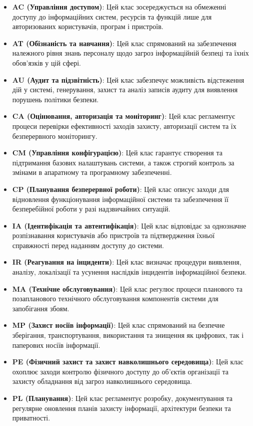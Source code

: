 \documentclass{article}
\begin{document}
\begin{itemize}
    \item \textbf{AC (Управління доступом)}: Цей клас зосереджується на обмеженні доступу до інформаційних систем, ресурсів та функцій лише для авторизованих користувачів, програм і пристроїв.
    \item \textbf{AT (Обізнаність та навчання)}: Цей клас спрямований на забезпечення належного рівня знань персоналу щодо загроз інформаційній безпеці та їхніх обов'язків у цій сфері.
    \item \textbf{AU (Аудит та підзвітність)}: Цей клас забезпечує можливість відстеження дій у системі, генерування, захист та аналіз записів аудиту для виявлення порушень політики безпеки.
    \item \textbf{CA (Оцінювання, авторизація та моніторинг)}: Цей клас регламентує процеси перевірки ефективності заходів захисту, авторизації систем та їх безперервного моніторингу.
    \item \textbf{CM (Управління конфігурацією)}: Цей клас гарантує створення та підтримання базових налаштувань системи, а також строгий контроль за змінами в апаратному та програмному забезпеченні.
    \item \textbf{CP (Планування безперервної роботи)}: Цей клас описує заходи для відновлення функціонування інформаційної системи та забезпечення її безперебійної роботи у разі надзвичайних ситуацій.
    \item \textbf{IA (Ідентифікація та автентифікація)}: Цей клас відповідає за однозначне розпізнавання користувачів або пристроїв та підтвердження їхньої справжності перед наданням доступу до системи.
    \item \textbf{IR (Реагування на інциденти)}: Цей клас визначає процедури виявлення, аналізу, локалізації та усунення наслідків інцидентів інформаційної безпеки.
    \item \textbf{MA (Технічне обслуговування)}: Цей клас регулює процеси планового та позапланового технічного обслуговування компонентів системи для запобігання збоям.
    \item \textbf{MP (Захист носіїв інформації)}: Цей клас спрямований на безпечне зберігання, транспортування, використання та знищення як цифрових, так і паперових носіїв інформації.
    \item \textbf{PE (Фізичний захист та захист навколишнього середовища)}: Цей клас охоплює заходи контролю фізичного доступу до об'єктів організації та захисту обладнання від загроз навколишнього середовища.
    \item \textbf{PL (Планування)}: Цей клас регламентує розробку, документування та регулярне оновлення планів захисту інформації, архітектури безпеки та приватності.

\end{itemize}
\end{document}
